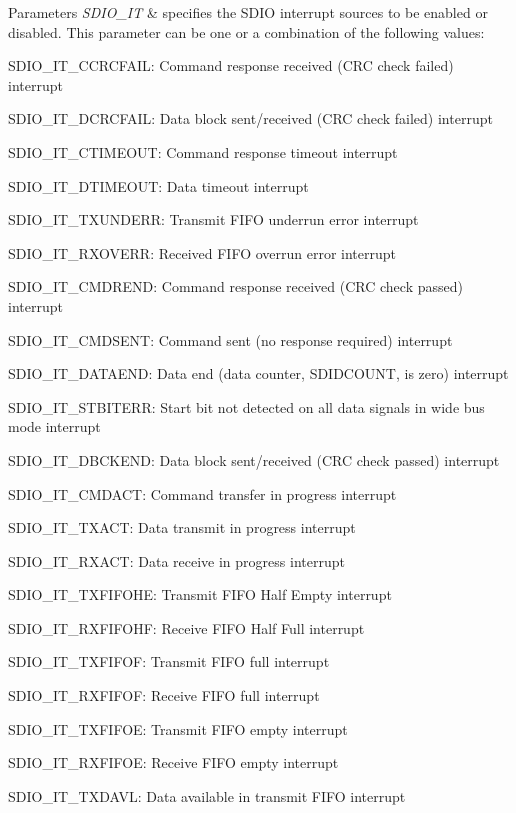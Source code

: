 \begin{DoxyParams}{Parameters}
{\em S\+D\+I\+O\+\_\+\+IT} & specifies the S\+D\+IO interrupt sources to be enabled or disabled. This parameter can be one or a combination of the following values\+: \begin{DoxyItemize}
\item S\+D\+I\+O\+\_\+\+I\+T\+\_\+\+C\+C\+R\+C\+F\+A\+IL\+: Command response received (C\+RC check failed) interrupt \item S\+D\+I\+O\+\_\+\+I\+T\+\_\+\+D\+C\+R\+C\+F\+A\+IL\+: Data block sent/received (C\+RC check failed) interrupt \item S\+D\+I\+O\+\_\+\+I\+T\+\_\+\+C\+T\+I\+M\+E\+O\+UT\+: Command response timeout interrupt \item S\+D\+I\+O\+\_\+\+I\+T\+\_\+\+D\+T\+I\+M\+E\+O\+UT\+: Data timeout interrupt \item S\+D\+I\+O\+\_\+\+I\+T\+\_\+\+T\+X\+U\+N\+D\+E\+RR\+: Transmit F\+I\+FO underrun error interrupt \item S\+D\+I\+O\+\_\+\+I\+T\+\_\+\+R\+X\+O\+V\+E\+RR\+: Received F\+I\+FO overrun error interrupt \item S\+D\+I\+O\+\_\+\+I\+T\+\_\+\+C\+M\+D\+R\+E\+ND\+: Command response received (C\+RC check passed) interrupt \item S\+D\+I\+O\+\_\+\+I\+T\+\_\+\+C\+M\+D\+S\+E\+NT\+: Command sent (no response required) interrupt \item S\+D\+I\+O\+\_\+\+I\+T\+\_\+\+D\+A\+T\+A\+E\+ND\+: Data end (data counter, S\+D\+I\+D\+C\+O\+U\+NT, is zero) interrupt \item S\+D\+I\+O\+\_\+\+I\+T\+\_\+\+S\+T\+B\+I\+T\+E\+RR\+: Start bit not detected on all data signals in wide bus mode interrupt \item S\+D\+I\+O\+\_\+\+I\+T\+\_\+\+D\+B\+C\+K\+E\+ND\+: Data block sent/received (C\+RC check passed) interrupt \item S\+D\+I\+O\+\_\+\+I\+T\+\_\+\+C\+M\+D\+A\+CT\+: Command transfer in progress interrupt \item S\+D\+I\+O\+\_\+\+I\+T\+\_\+\+T\+X\+A\+CT\+: Data transmit in progress interrupt \item S\+D\+I\+O\+\_\+\+I\+T\+\_\+\+R\+X\+A\+CT\+: Data receive in progress interrupt \item S\+D\+I\+O\+\_\+\+I\+T\+\_\+\+T\+X\+F\+I\+F\+O\+HE\+: Transmit F\+I\+FO Half Empty interrupt \item S\+D\+I\+O\+\_\+\+I\+T\+\_\+\+R\+X\+F\+I\+F\+O\+HF\+: Receive F\+I\+FO Half Full interrupt \item S\+D\+I\+O\+\_\+\+I\+T\+\_\+\+T\+X\+F\+I\+F\+OF\+: Transmit F\+I\+FO full interrupt \item S\+D\+I\+O\+\_\+\+I\+T\+\_\+\+R\+X\+F\+I\+F\+OF\+: Receive F\+I\+FO full interrupt \item S\+D\+I\+O\+\_\+\+I\+T\+\_\+\+T\+X\+F\+I\+F\+OE\+: Transmit F\+I\+FO empty interrupt \item S\+D\+I\+O\+\_\+\+I\+T\+\_\+\+R\+X\+F\+I\+F\+OE\+: Receive F\+I\+FO empty interrupt \item S\+D\+I\+O\+\_\+\+I\+T\+\_\+\+T\+X\+D\+A\+VL\+: Data available in transmit F\+I\+FO interrupt \item 
\end{DoxyItemize}
\end{DoxyParams}
